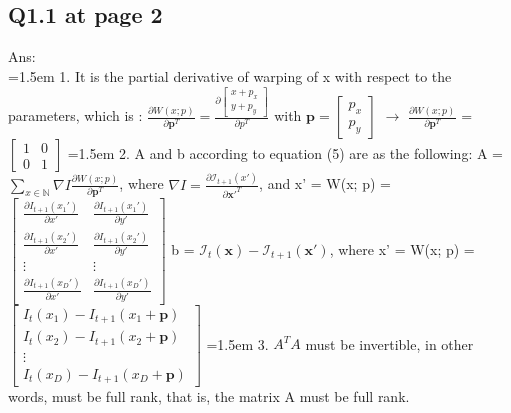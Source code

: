 \documentclass{article}
\begin{document}
	\subsection*{Q1.1 at page 2}
	Ans:\\
	\hangindent=1.5em \hspace{1.5em} 1. It is the partial derivative of warping of x with respect to the parameters, which is : \newline $\frac{\partial W(x; p)}{\partial \mathbf{p}^T} = \frac{\partial \begin{bmatrix} x+p_x \\ y+p_y \end{bmatrix}}{\partial p^T}$ with $\mathbf{p} = \begin{bmatrix} p_x \\ p_y \end{bmatrix}$
	 \newline
	 $\rightarrow$ $\frac{\partial W(x; p)}{\partial \mathbf{p}^T}$ = $\begin{bmatrix} 1 & 0   \\ 0 & 1 \end{bmatrix}$
	\newline
	\newline
	\newline
	\hangindent=1.5em \hspace{1.5em} 2.	A and b according to equation (5) are as the following:
	\newline 
		A = $\sum_{x \in \mathbb{N}}$$\nabla I \frac{\partial W(x; p)}{\partial \mathbf{p}^T}$, where $\nabla I = \frac{\partial \mathcal{I}_{t+1}(x')}{\partial \mathbf{x'}^T}$, and x' = W(x; p)
	\newline
		= 
	$
	\begin{bmatrix}
		\frac{\partial I_{t+1}(x_1')}{\partial x'} & \frac{\partial I_{t+1}(x_1')}{\partial y'} \\
		\frac{\partial I_{t+1}(x_2')}{\partial x'} & \frac{\partial I_{t+1}(x_2')}{\partial y'} \\
		\vdots & \vdots \\
		\frac{\partial I_{t+1}(x_D')}{\partial x'} & \frac{\partial I_{t+1}(x_D')}{\partial y'}
	\end{bmatrix}$
	\newline
		b = $\mathcal{I}_t(\mathbf{x}) - \mathcal{I}_{t+1}(\mathbf{x'})$, where x' = W(x; p)
	\newline
		=
	$
	\begin{bmatrix}
		I_t(x_1) - I_{t+1}(x_1 + \mathbf{p}) \\
		I_t(x_2) - I_{t+1}(x_2 + \mathbf{p}) \\
		\vdots \\
		I_t(x_D) - I_{t+1}(x_D + \mathbf{p})
	\end{bmatrix}$
	\newline
	\newline
	\newline
	\hangindent=1.5em \hspace{1.5em} 3. ${A}^TA$ must be invertible, in other words, must be full rank, that is, the matrix A must be full rank.
	
\end{document}
